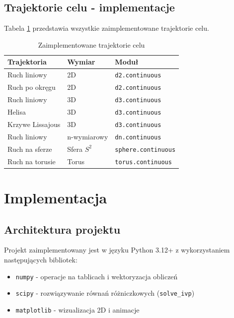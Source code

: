 \documentclass[12pt,a4paper]{article}
\begin{document}
\subsection{Trajektorie celu - implementacje}

Tabela \ref{tab:targets} przedstawia wszystkie zaimplementowane trajektorie celu.

\begin{table}[H]
\centering
\caption{Zaimplementowane trajektorie celu}
\label{tab:targets}
\begin{tabular}{@{}lll@{}}
\toprule
\textbf{Trajektoria} & \textbf{Wymiar} & \textbf{Moduł} \\ \midrule
Ruch liniowy & 2D & \texttt{d2.continuous} \\
Ruch po okręgu & 2D & \texttt{d2.continuous} \\
Ruch liniowy & 3D & \texttt{d3.continuous} \\
Helisa & 3D & \texttt{d3.continuous} \\
Krzywe Lissajous & 3D & \texttt{d3.continuous} \\
Ruch liniowy & n-wymiarowy & \texttt{dn.continuous} \\
Ruch na sferze & Sfera $S^2$ & \texttt{sphere.continuous} \\
Ruch na torusie & Torus & \texttt{torus.continuous} \\ \bottomrule
\end{tabular}
\end{table}

\section{Implementacja}

\subsection{Architektura projektu}

Projekt zaimplementowany jest w języku Python 3.12+ z wykorzystaniem następujących bibliotek:
\begin{itemize}
    \item \texttt{numpy} - operacje na tablicach i wektoryzacja obliczeń
    \item \texttt{scipy} - rozwiązywanie równań różniczkowych (\texttt{solve\_ivp})
    \item \texttt{matplotlib} - wizualizacja 2D i animacje
\end{itemize}
\end{document}
